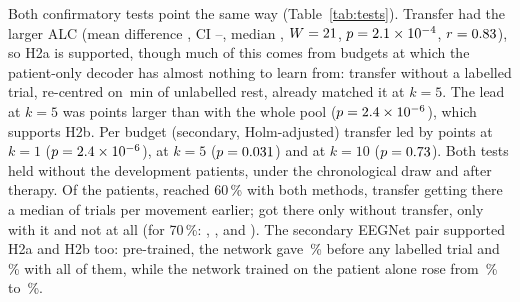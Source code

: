 Both confirmatory tests point the same way (Table~\ref{tab:tests}). Transfer had the larger ALC
(mean difference \rqTwoHTwoADiff, CI \rqTwoHTwoADiffCiLo--\rqTwoHTwoADiffCiHi, median
\rqTwoHTwoAMedianDiff, $W = 21$, $p = 2.1\times10^{-4}$, $r = 0.83$), so H2a is
supported, though much of this comes from budgets at which the patient-only decoder has almost
nothing to learn from: transfer without a labelled trial, re-centred on
\rqTwoRestMinutes\,min of unlabelled rest, already matched it at $k = 5$. The lead
at $k = 5$ was \rqTwoHTwoBPointsDiff{} points larger than with the whole pool
($p = 2.4\times10^{-6}$), which supports H2b. Per budget (secondary, Holm-adjusted) transfer led by
\rqTwoAdvantageKOneDiff{} points at $k = 1$ ($p = 2.4\times10^{-6}$),
\rqTwoAdvantageKFiveDiff{} at $k = 5$ ($p = 0.031$) and
\rqTwoAdvantageKTenDiff{} at $k = 10$ ($p = 0.73$). Both tests held without
the development patients, under the chronological draw and after therapy. Of the
\rqTwoHTwoAN{} patients, \rqTwoReachRestAhSfSixtyBoth{} reached 60\,\% with both methods,
transfer getting there a median of \rqTwoReachRestAhSfSixtyMedianSaved{} trials per movement
earlier; \rqTwoReachRestAhSfSixtyOnlyScratch{} got there only without transfer,
\rqTwoReachRestAhSfSixtyOnlyTransfer{} only with it and \rqTwoReachRestAhSfSixtyNeither{} not at
all (for 70\,\%: \rqTwoReachRestAhSfSeventyBoth, \rqTwoReachRestAhSfSeventyOnlyScratch,
\rqTwoReachRestAhSfSeventyOnlyTransfer{} and \rqTwoReachRestAhSfSeventyNeither). The secondary
EEGNet pair supported H2a and H2b too: pre-trained, the network gave
\rqTwoRestAhSfEegnetEaFtKZeroMean\,\% before any labelled trial and
\rqTwoRestAhSfEegnetEaFtKAllMean\,\% with all of them, while the network trained on the patient
alone rose from \rqTwoRestAhSfEegnetScratchKOneMean\,\% to \rqTwoRestAhSfEegnetScratchKAllMean\,\%.

